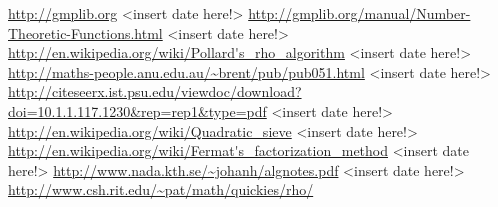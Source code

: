 \documentclass[paper=a4, fontsize=11pt,numbers=endperiod]{scrartcl} %
\numberwithin{equation}{section} %
\numberwithin{figure}{section} %
\numberwithin{table}{section} %
\begin{document}
\begin{thebibliography}{9}

\url{http://gmplib.org} <insert date here!>
\url{http://gmplib.org/manual/Number-Theoretic-Functions.html} <insert date here!>
\url{http://en.wikipedia.org/wiki/Pollard's_rho_algorithm} <insert date here!>
\url{http://maths-people.anu.edu.au/~brent/pub/pub051.html} <insert date here!>
\url{http://citeseerx.ist.psu.edu/viewdoc/download?doi=10.1.1.117.1230&rep=rep1&type=pdf} <insert date here!>
\url{http://en.wikipedia.org/wiki/Quadratic_sieve} <insert date here!>
\url{http://en.wikipedia.org/wiki/Fermat's_factorization_method} <insert date here!>
\url{http://www.nada.kth.se/~johanh/algnotes.pdf} <insert date here!>
\url{http://www.csh.rit.edu/~pat/math/quickies/rho/}
\end{thebibliography}
\end{document}
